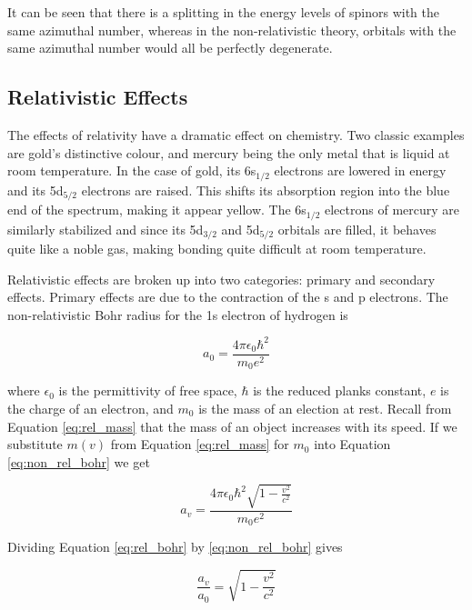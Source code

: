 It can be seen that there is a splitting in the energy levels of spinors with the same azimuthal number, whereas in the non-relativistic theory, orbitals with the same azimuthal number would all be perfectly degenerate.

\subsection{Relativistic Effects}
The effects of relativity have a dramatic effect on chemistry. Two classic examples are gold's distinctive colour, and mercury being the only metal that is liquid at room temperature. In the case of gold, its 6s$_{1/2}$ electrons are lowered in energy and its 5d$_{5/2}$ electrons are raised. This shifts its absorption region into the blue end of the spectrum, making it appear yellow\cite{Bartlett1998}. The 6s$_{1/2}$ electrons of mercury are similarly stabilized and since its 5d$_{3/2}$ and 5d$_{5/2}$ orbitals are filled, it behaves quite like a noble gas, making bonding quite difficult at room temperature\cite{Norrby1991}.

Relativistic effects are broken up into two categories: primary and secondary effects. Primary effects are due to the contraction of the s and p electrons. The non-relativistic Bohr radius for the 1s electron of hydrogen is\cite{Griffiths2} 

\begin{equation}
\label{eq:non_rel_bohr}
a_{0} = \frac{4\pi{}\epsilon_{0}\hbar^{2}}{m_{0}e^{2}}
\end{equation}

where $\epsilon_{0}$ is the permittivity of free space, $\hbar$ is the reduced planks constant, $e$ is the charge of an electron, and $m_{0}$ is the mass of an election at rest. Recall from Equation \ref{eq:rel_mass} that the mass of an object increases with its speed. If we substitute $m(v)$ from Equation \ref{eq:rel_mass} for $m_{0}$ into Equation \ref{eq:non_rel_bohr} we get

\begin{equation}
\label{eq:rel_bohr}
a_{v} = \frac{4\pi{}\epsilon_{0}\hbar^{2}\sqrt{1 - \frac{v^2}{c^2}}}{m_{0}e^{2}}
\end{equation}

Dividing Equation \ref{eq:rel_bohr} by \ref{eq:non_rel_bohr} gives 

\begin{equation}
\label{eq:bohr_frac}
\frac{a_{v}}{a_{0}} = \sqrt{1 - \frac{v^2}{c^2}}
\end{equation}

